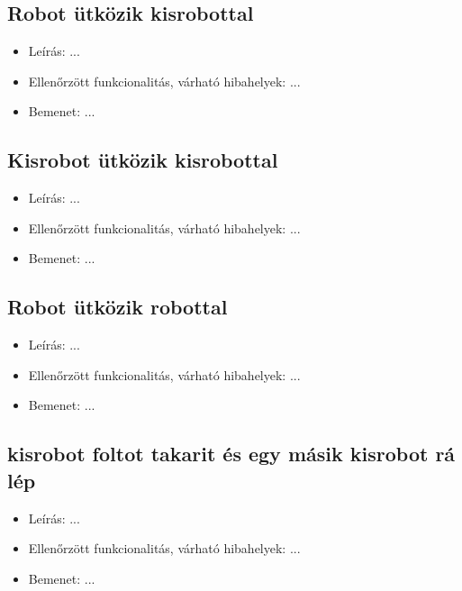 \subsection{Robot ütközik kisrobottal}
\begin{itemize}
	\item Leírás: \newline
	...
	\item Ellenőrzött funkcionalitás, várható hibahelyek: \newline
	...
	\item Bemenet: \newline
	... \newline
\end{itemize}

\subsection{Kisrobot ütközik kisrobottal}
\begin{itemize}
	\item Leírás: \newline
	...
	\item Ellenőrzött funkcionalitás, várható hibahelyek: \newline
	...
	\item Bemenet: \newline
	... \newline
\end{itemize}

\subsection{Robot ütközik robottal}
\begin{itemize}
	\item Leírás: \newline
	...
	\item Ellenőrzött funkcionalitás, várható hibahelyek: \newline
	...
	\item Bemenet: \newline
	... \newline
\end{itemize}

\subsection{kisrobot foltot takarit és egy másik kisrobot rá lép}
\begin{itemize}
	\item Leírás: \newline
	...
	\item Ellenőrzött funkcionalitás, várható hibahelyek: \newline
	...
	\item Bemenet: \newline
	... \newline
\end{itemize}

